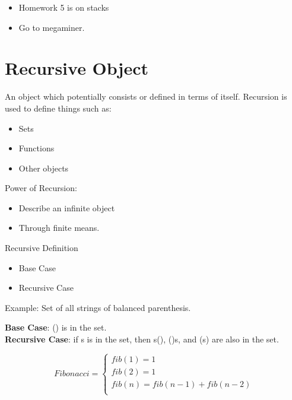 \documentclass[12pt]{article}
\begin{document}
\begin{itemize}
\item Homework 5 is on stacks
\item Go to megaminer.
\end{itemize}

\section{Recursive Object}
An object which potentially consists or defined in terms of itself. Recursion is used to define things such as:

\begin{itemize}
\item Sets
\item Functions
\item Other objects
\end{itemize}

Power of Recursion:
\begin{itemize}
\item Describe an infinite object
\item Through finite means.
\end{itemize}

Recursive Definition
\begin{itemize}
\item Base Case
\item Recursive Case
\end{itemize}

Example: Set of all strings of balanced parenthesis.


\textbf{Base Case}: () is in the set. \\
\textbf{Recursive Case}: if s is in the set, then s(), ()s, and (s) are also in the set.

\begin{equation}
  Fibonacci = \left\{
    \begin{array}{rl}
      fib(1) = 1 \\
      fib(2) = 1 \\
      fib(n) = fib(n -1) + fib(n - 2) \\
    \end{array} \right.
\end{equation}
\end{document}
